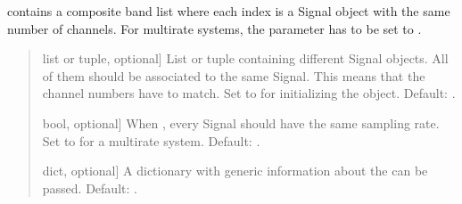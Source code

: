 \documentclass[letterpaper,10pt,english]{sphinxmanual}
\begin{document}
\begin{fulllineitems}
\begin{fulllineitems}
\label{\detokenize{classes:dsptools.classes.multibandsignal.MultiBandSignal.__init__}}
\pysigstartsignatures
{}
\pysigstopsignatures
\sphinxAtStartPar
{} contains a composite band list where each index
is a Signal object with the same number of channels. For multirate
systems, the parameter  has to be set to .
\begin{quote}\begin{description}
\begin{description}
\sphinxlineitem{\sphinxstylestrong{bands}}{[}list or tuple, optional{]}
\sphinxAtStartPar
List or tuple containing different Signal objects. All of them
should be associated to the same Signal. This means that the
channel numbers have to match. Set to  for initializing the
object. Default: .

\sphinxlineitem{\sphinxstylestrong{same\_sampling\_rate}}{[}bool, optional{]}
\sphinxAtStartPar
When , every Signal should have the same sampling rate.
Set to  for a multirate system. Default: .

\sphinxlineitem{\sphinxstylestrong{info}}{[}dict, optional{]}
\sphinxAtStartPar
A dictionary with generic information about the 
can be passed. Default: .

\end{description}

\end{description}\end{quote}

\end{fulllineitems}



\end{fulllineitems}
\end{document}
